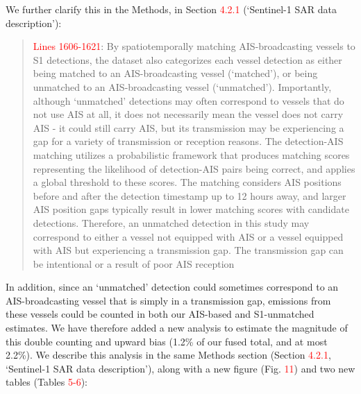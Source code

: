 \documentclass[11pt]{article}
\begin{document}
We further clarify this in the Methods, in Section \textcolor{red}{4.2.1} (`Sentinel-1 SAR data description'):

\begin{quote}
\textcolor{red}{Lines 1606-1621}: By spatiotemporally matching AIS-broadcasting vessels to S1 detections, the dataset also categorizes each vessel detection as either being matched to an AIS-broadcasting vessel (`matched'), or being unmatched to an AIS-broadcasting vessel (`unmatched'). Importantly, although `unmatched' detections may often correspond to vessels that do not use AIS at all, it does not necessarily mean the vessel does not carry AIS - it could still carry AIS, but its transmission may be experiencing a gap for a variety of transmission or reception reasons. The detection-AIS matching utilizes a probabilistic framework that produces matching scores representing the likelihood of detection-AIS pairs being correct, and applies a global threshold to these scores. The matching considers AIS positions before and after the detection timestamp up to 12 hours away, and larger AIS position gaps typically result in lower matching scores with candidate detections. Therefore, an unmatched detection in this study may correspond to either a vessel not equipped with AIS or a vessel equipped with AIS but experiencing a transmission gap. The transmission gap can be intentional or a result of poor AIS reception
\end{quote}

In addition, since an `unmatched' detection could sometimes correspond to an AIS-broadcasting vessel that is simply in a transmission gap, emissions from these vessels could be counted in both our AIS-based and S1-unmatched estimates. We have therefore added a new analysis to estimate the magnitude of this double counting and upward bias (1.2\% of our fused total, and at most 2.2\%). We describe this analysis in the same Methods section (Section \textcolor{red}{4.2.1}, `Sentinel-1 SAR data description'), along with a new figure (Fig. \textcolor{red}{11}) and two new tables (Tables \textcolor{red}{5-6}):
\end{document}
